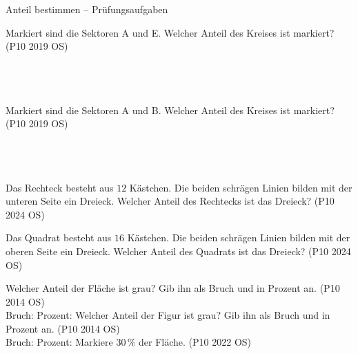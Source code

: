 \setcounter{aufgabe}{3}

\begin{aufgabe}{Anteil bestimmen – Prüfungsaufgaben}
\begin{teile}
\teil Markiert sind die Sektoren A und E. Welcher Anteil des Kreises ist markiert? \hfill (P10 2019 OS)\\ \\ \\ \\ 

\teil Markiert sind die Sektoren A und B. Welcher Anteil des Kreises ist markiert? \hfill (P10 2019 OS)\\ \\ \\ \\ 

\teil Das Rechteck besteht aus $12$ Kästchen. Die beiden schrägen Linien bilden mit der unteren Seite ein Dreieck. Welcher Anteil des Rechtecks ist das Dreieck? \hfill (P10 2024 OS) \\

\begin{ksys}[xmin=0,xmax=6,ymin=0,ymax=2,ablesen]   \end{ksys}
\leerfeld
\teil Das Quadrat besteht aus $16$ Kästchen. Die beiden schrägen Linien bilden mit der oberen Seite ein Dreieck. Welcher Anteil des Quadrats ist das Dreieck? \hfill (P10 2024 OS) \\

\begin{ksys}[xmin=0,xmax=4,ymin=0,ymax=4,ablesen]   \end{ksys}
\leerfeld
\teil Welcher Anteil der Fläche ist grau? Gib ihn als Bruch und in Prozent an. \hfill (P10 2014 OS) \\

Bruch: \leerfeld Prozent: \leerfeld[\%]
\teil Welcher Anteil der Figur ist grau? Gib ihn als Bruch und in Prozent an. \hfill (P10 2014 OS) \\

Bruch: \leerfeld Prozent: \leerfeld[\%]
\teil Markiere $30\,\%$ der Fläche. \hfill (P10 2022 OS)


\end{teile}
\end{aufgabe}

